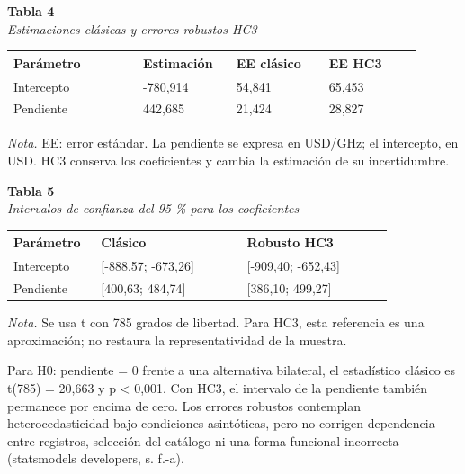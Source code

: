 \documentclass[12pt,letterpaper]{article}
\begin{document}
\begin{center}\begin{minipage}{\linewidth}\textbf{Tabla 4}\\\textit{Estimaciones clásicas y errores robustos HC3}\\\begin{singlespace}\small
\begin{tabular}{@{}p{0.2821\linewidth}p{0.2051\linewidth}p{0.2051\linewidth}p{0.2051\linewidth}@{}}\toprule
\textbf{Parámetro} & \textbf{Estimación} & \textbf{EE clásico} & \textbf{EE HC3}\\\midrule
Intercepto & -780,914 & 54,841 & 65,453\\
Pendiente & 442,685 & 21,424 & 28,827\\
\bottomrule\end{tabular}\end{singlespace}
\small\textit{Nota.} EE: error estándar. La pendiente se expresa en USD/GHz; el intercepto, en USD. HC3 conserva los coeficientes y cambia la estimación de su incertidumbre.
\end{minipage}\end{center}
\begin{center}\begin{minipage}{\linewidth}\textbf{Tabla 5}\\\textit{Intervalos de confianza del 95 \% para los coeficientes}\\\begin{singlespace}\small
\begin{tabular}{@{}p{0.2179\linewidth}p{0.3526\linewidth}p{0.3526\linewidth}@{}}\toprule
\textbf{Parámetro} & \textbf{Clásico} & \textbf{Robusto HC3}\\\midrule
Intercepto & [-888,57; -673,26] & [-909,40; -652,43]\\
Pendiente & [400,63; 484,74] & [386,10; 499,27]\\
\bottomrule\end{tabular}\end{singlespace}
\small\textit{Nota.} Se usa t con 785 grados de libertad. Para HC3, esta referencia es una aproximación; no restaura la representatividad de la muestra.
\end{minipage}\end{center}
Para H0: pendiente = 0 frente a una alternativa bilateral, el estadístico clásico es t(785) = 20,663 y p < 0,001. Con HC3, el intervalo de la pendiente también permanece por encima de cero. Los errores robustos contemplan heterocedasticidad bajo condiciones asintóticas, pero no corrigen dependencia entre registros, selección del catálogo ni una forma funcional incorrecta (statsmodels developers, s. f.-a).
\end{document}
